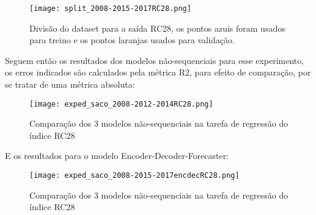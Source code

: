 \begin{figure}[H]
  \centering
\texttt{[image: split\_2008-2015-2017RC28.png]}
\caption{Divisão do dataset para a saída RC28, os pontos azuis foram usados para
treino e os pontos laranjas usados para validação.}
  \label{fig:divrc28}
\end{figure}


Seguem então os resultados dos modelos não-sequenciais para esse experimento, os
erros indicados são calculados pela métrica R2, para efeito de comparação, por
se tratar de uma métrica absoluta: \\




\begin{figure}[H]
\centering
\texttt{[image: exped\_saco\_2008-2012-2014RC28.png]}
\caption{Comparação dos 3 modelos não-sequenciais na tarefa de regressão do índice RC28}
\label{fig:3nseq}
\end{figure}



E os resultados para o modelo Encoder-Decoder-Forecaster: \\


\begin{figure}[H]
\centering
\texttt{[image: exped\_saco\_2008-2015-2017encdecRC28.png]}
\caption{Comparação dos 3 modelos não-sequenciais na tarefa de regressão do índice RC28}
\label{fig:3nseq}
\end{figure}


